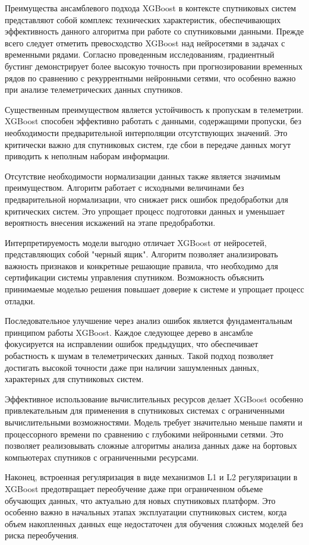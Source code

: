 Преимущества ансамблевого подхода XGBoost в контексте спутниковых систем
представляют собой комплекс технических характеристик, обеспечивающих
эффективность данного алгоритма при работе со спутниковыми данными.
Прежде всего следует отметить превосходство XGBoost над нейросетями в задачах с
временными рядами. Согласно проведенным исследованиям, градиентный бустинг
демонстрирует более высокую точность при прогнозировании временных рядов по
сравнению с рекуррентными нейронными сетями, что особенно важно при анализе
телеметрических данных спутников.

Существенным преимуществом является устойчивость к пропускам в телеметрии.
XGBoost способен эффективно работать с данными, содержащими пропуски, без
необходимости предварительной интерполяции отсутствующих значений. Это
критически важно для спутниковых систем, где сбои в передаче данных могут
приводить к неполным наборам информации.

Отсутствие необходимости нормализации данных также является значимым
преимуществом. Алгоритм работает с исходными величинами без предварительной
нормализации, что снижает риск ошибок предобработки для критических систем. Это
упрощает процесс подготовки данных и уменьшает вероятность внесения искажений на
этапе предобработки.

Интерпретируемость модели выгодно отличает XGBoost от нейросетей, представляющих
собой "черный ящик". Алгоритм позволяет анализировать важность признаков и
конкретные решающие правила, что необходимо для сертификации системы управления
спутником. Возможность объяснить принимаемые моделью решения повышает доверие к
системе и упрощает процесс отладки.

Последовательное улучшение через анализ ошибок является фундаментальным
принципом работы XGBoost. Каждое следующее дерево в ансамбле фокусируется на
исправлении ошибок предыдущих, что обеспечивает робастность к шумам в
телеметрических данных. Такой подход позволяет достигать высокой точности даже
при наличии зашумленных данных, характерных для спутниковых систем.

Эффективное использование вычислительных ресурсов делает XGBoost особенно
привлекательным для применения в спутниковых системах с ограниченными
вычислительными возможностями. Модель требует значительно меньше памяти и
процессорного времени по сравнению с глубокими нейронными сетями. Это позволяет
реализовывать сложные алгоритмы анализа данных даже на бортовых компьютерах
спутников с ограниченными ресурсами.

Наконец, встроенная регуляризация в виде механизмов L1 и L2 регуляризации в
XGBoost предотвращает переобучение даже при ограниченном объеме обучающих
данных, что актуально для новых спутниковых платформ. Это особенно важно в
начальных этапах эксплуатации спутниковых систем, когда объем накопленных данных
еще недостаточен для обучения сложных моделей без риска переобучения.

